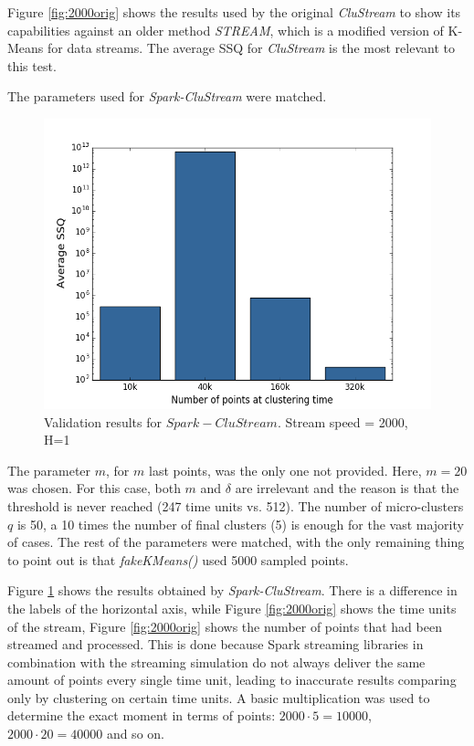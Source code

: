 \documentclass[10pt, conference, compsocconf]{IEEEtran}
\begin{document}
Figure \ref{fig:2000orig} shows the results used by the original \textit{CluStream} to show its capabilities against an older method \textit{STREAM}, which is a modified version of K-Means for data streams. The average SSQ for \textit{CluStream} is the most relevant to this test.

The parameters used for \textit{Spark-CluStream} were matched. 

\begin{figure}[h!]
 \centering
 \includegraphics[scale=0.45]{./styles/2000h1.png}
 \caption{Validation results for $Spark-CluStream$. Stream speed = 2000, H=1}
 \label{fig:2000}
\end{figure}

The parameter $m$, for $m$ last points, was the only one not provided. Here, $m=20$ was chosen. For this case, both $m$ and $\delta$ are irrelevant and the reason is that the threshold is never reached (247 time units vs. 512). The number of micro-clusters $q$ is 50, a 10 times the number of final clusters (5) is enough for the vast majority of cases\cite{clustreamOrig}. The rest of the parameters were matched, with the only remaining thing to point out is that \textit{fakeKMeans()} used 5000 sampled points.

Figure \ref{fig:2000} shows the results obtained by \textit{Spark-CluStream}. There is a difference in the labels of the horizontal axis, while Figure \ref{fig:2000orig} shows the time units of the stream, Figure \ref{fig:2000orig} shows the number of points that had been streamed and processed. This is done because Spark streaming libraries in combination with the streaming simulation do not always deliver the same amount of points every single time unit, leading to inaccurate results comparing only by clustering on certain time units. A basic multiplication was used to determine the exact moment in terms of points: $2000\cdot 5 = 10000$, $2000\cdot 20 = 40000$ and so on.
\end{document}
